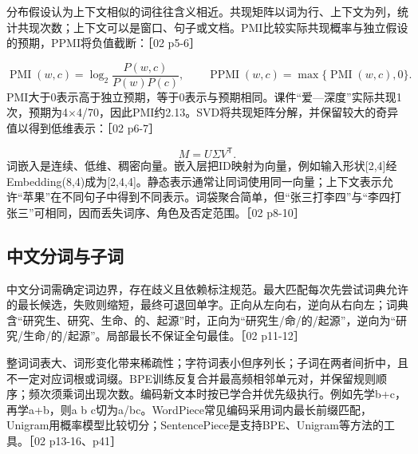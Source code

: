 \documentclass[UTF8,a4paper,zihao=-4,fontset=windows]{ctexart}
\begin{document}
分布假设认为上下文相似的词往往含义相近。共现矩阵以词为行、上下文为列，统计共现次数；上下文可以是窗口、句子或文档。PMI比较实际共现概率与独立假设的预期，PPMI将负值截断：［02 p5-6］

\[\operatorname{PMI}(w,c)=\log_2\frac{P(w,c)}{P(w)P(c)},\qquad \operatorname{PPMI}(w,c)=\max\{\operatorname{PMI}(w,c),0\}.\]
PMI大于0表示高于独立预期，等于0表示与预期相同。课件“爱---深度”实际共现1次，预期为4\ensuremath{\times}4/\allowbreak{}70，因此PMI约2.13。SVD将共现矩阵分解，并保留较大的奇异值以得到低维表示：［02 p6-7］

\[M=U\Sigma V^{\mathsf T}.\]
词嵌入是连续、低维、稠密向量。嵌入层把ID映射为向量，例如输入形状[2,4]经Embedding(8,4)成为[2,4,4]。静态表示通常让同词使用同一向量；上下文表示允许“苹果”在不同句子中得到不同表示。词袋聚合简单，但“张三打李四”与“李四打张三”可相同，因而丢失词序、角色及否定范围。［02 p8-10］

\subsection{中文分词与子词}
中文分词需确定词边界，存在歧义且依赖标注规范。最大匹配每次先尝试词典允许的最长候选，失败则缩短，最终可退回单字。正向从左向右，逆向从右向左；词典含“研究生、研究、生命、的、起源”时，正向为“研究生/\allowbreak{}命/\allowbreak{}的/\allowbreak{}起源”，逆向为“研究/\allowbreak{}生命/\allowbreak{}的/\allowbreak{}起源”。局部最长不保证全句最佳。［02 p11-12］

整词词表大、词形变化带来稀疏性；字符词表小但序列长；子词在两者间折中，且不一定对应词根或词缀。BPE训练反复合并最高频相邻单元对，并保留规则顺序；频次须乘词出现次数。编码新文本时按已学合并优先级执行。例如先学b+c，再学a+b，则a b c切为a/\allowbreak{}bc。WordPiece常见编码采用词内最长前缀匹配，Unigram用概率模型比较切分；SentencePiece是支持BPE、Unigram等方法的工具。［02 p13-16、p41］

\end{document}
